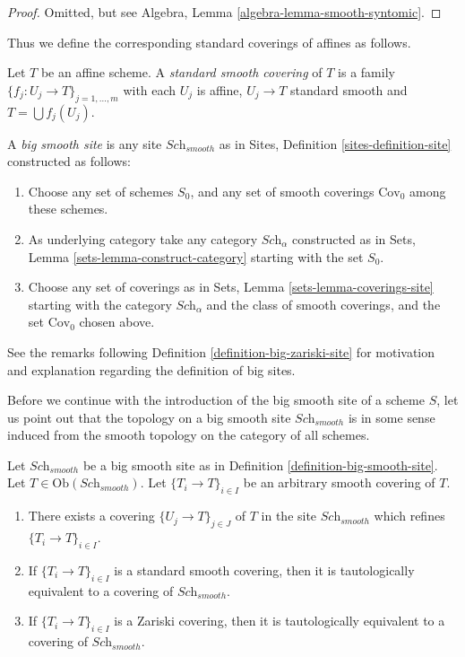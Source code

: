 \begin{proof}
Omitted, but see Algebra, Lemma \ref{algebra-lemma-smooth-syntomic}.
\end{proof}

\noindent
Thus we define the corresponding standard coverings of affines as follows.

\begin{definition}
\label{definition-standard-smooth}
Let $T$ be an affine scheme. A {\it standard smooth covering}
of $T$ is a family $\{f_j : U_j \to T\}_{j = 1, \ldots, m}$
with each $U_j$ is affine, $U_j \to T$ standard smooth
and $T = \bigcup f_j(U_j)$.
\end{definition}

\begin{definition}
\label{definition-big-smooth-site}
A {\it big smooth site} is any site $\textit{Sch}_{smooth}$ as in
Sites, Definition \ref{sites-definition-site} constructed as follows:
\begin{enumerate}
\item Choose any set of schemes $S_0$, and any set of smooth coverings
$\text{Cov}_0$ among these schemes.
\item As underlying category take any category $\textit{Sch}_\alpha$
constructed as in Sets, Lemma \ref{sets-lemma-construct-category}
starting with the set $S_0$.
\item Choose any set of coverings as in
Sets, Lemma \ref{sets-lemma-coverings-site} starting with the
category $\textit{Sch}_\alpha$ and the class of smooth coverings,
and the set $\text{Cov}_0$ chosen above.
\end{enumerate}
\end{definition}

\noindent
See the remarks following Definition \ref{definition-big-zariski-site}
for motivation and explanation regarding the definition of big sites.

\medskip\noindent
Before we continue with the introduction of the big smooth site of
a scheme $S$, let us point out that the topology on a big smooth site
$\textit{Sch}_{smooth}$ is in some sense induced from the smooth topology
on the category of all schemes.

\begin{lemma}
\label{lemma-smooth-induced}
Let $\textit{Sch}_{smooth}$ be a big smooth site as in
Definition \ref{definition-big-smooth-site}.
Let $T \in \text{Ob}(\textit{Sch}_{smooth})$.
Let $\{T_i \to T\}_{i \in I}$ be an arbitrary smooth covering of $T$.
\begin{enumerate}
\item There exists a covering $\{U_j \to T\}_{j \in J}$ of $T$ in the site
$\textit{Sch}_{smooth}$ which refines $\{T_i \to T\}_{i \in I}$.
\item If $\{T_i \to T\}_{i \in I}$ is a standard smooth covering, then
it is tautologically equivalent to a covering of $\textit{Sch}_{smooth}$.
\item If $\{T_i \to T\}_{i \in I}$ is a Zariski covering, then
it is tautologically equivalent to a covering of $\textit{Sch}_{smooth}$.
\end{enumerate}
\end{lemma}

